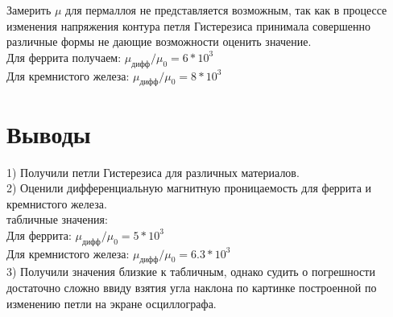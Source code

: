 \documentclass[a4paper, 12pt]{article}%
\begin{document}
	Замерить $\mu$ для пермаллоя не представляется возможным, так как в процессе изменения напряжения контура петля Гистерезиса принимала совершенно различные формы не дающие возможности оценить значение.\\
	Для феррита получаем: $\mu_{дифф}/\mu _0 =  6 * 10^3$\\
	Для кремнистого железа:  $\mu_{дифф}/\mu _0 =  8 * 10^3$\\
	\section{Выводы}
	1) Получили петли Гистерезиса для различных материалов.\\
	2) Оценили дифференциальную магнитную проницаемость для феррита и кремнистого железа.\\
	табличные значения: \\
	Для феррита: $\mu_{дифф}/\mu _0 =  5 * 10^3$\\
	Для кремнистого железа:  $\mu_{дифф}/\mu _0 =  6.3 * 10^3$\\
	3) Получили значения близкие к табличным, однако судить о погрешности достаточно сложно ввиду взятия угла наклона по картинке построенной по изменению петли на экране осциллографа.
	
	
\end{document}
